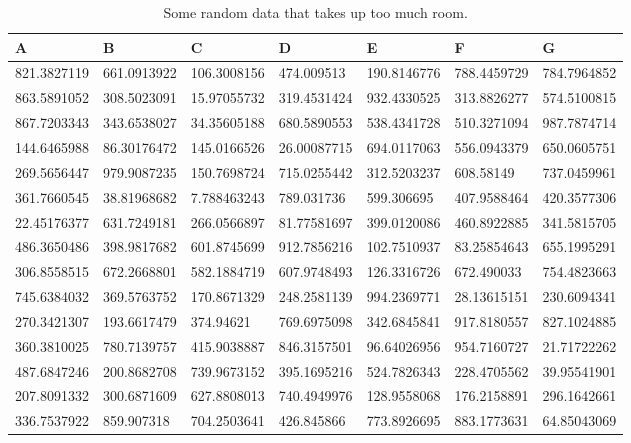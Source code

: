 \documentclass[lscape]{msu-thesis}
\begin{document}
\begin{landscape}
\begin{table}
\centering
\begin{tabular}{lllllll}

\toprule
A & B & C & D & E & F & G \\
\midrule
821.3827119 & 661.0913922 & 106.3008156 & 474.009513 & 190.8146776 & 788.4459729 & 784.7964852 \\
863.5891052 & 308.5023091 & 15.97055732 & 319.4531424 & 932.4330525 & 313.8826277 & 574.5100815 \\
867.7203343 & 343.6538027 & 34.35605188 & 680.5890553 & 538.4341728 & 510.3271094 & 987.7874714 \\
144.6465988 & 86.30176472 & 145.0166526 & 26.00087715 & 694.0117063 & 556.0943379 & 650.0605751 \\
269.5656447 & 979.9087235 & 150.7698724 & 715.0255442 & 312.5203237 & 608.58149 & 737.0459961 \\
361.7660545 & 38.81968682 & 7.788463243 & 789.031736 & 599.306695 & 407.9588464 & 420.3577306 \\
22.45176377 & 631.7249181 & 266.0566897 & 81.77581697 & 399.0120086 & 460.8922885 & 341.5815705 \\
486.3650486 & 398.9817682 & 601.8745699 & 912.7856216 & 102.7510937 & 83.25854643 & 655.1995291 \\
306.8558515 & 672.2668801 & 582.1884719 & 607.9748493 & 126.3316726 & 672.490033 & 754.4823663 \\
745.6384032 & 369.5763752 & 170.8671329 & 248.2581139 & 994.2369771 & 28.13615151 & 230.6094341 \\
270.3421307 & 193.6617479 & 374.94621 & 769.6975098 & 342.6845841 & 917.8180557 & 827.1024885 \\
360.3810025 & 780.7139757 & 415.9038887 & 846.3157501 & 96.64026956 & 954.7160727 & 21.71722262 \\
487.6847246 & 200.8682708 & 739.9673152 & 395.1695216 & 524.7826343 & 228.4705562 & 39.95541901 \\
207.8091332 & 300.6871609 & 627.8808013 & 740.4949976 & 128.9558068 & 176.2158891 & 296.1642661 \\
336.7537922 & 859.907318 & 704.2503641 & 426.845866 & 773.8926695 & 883.1773631 & 64.85043069 \\

\bottomrule
\end{tabular}

\caption{Some random data that takes up too much room.}
\end{table}
\end{landscape}
\pagestyle{plain}
%
\end{document}
